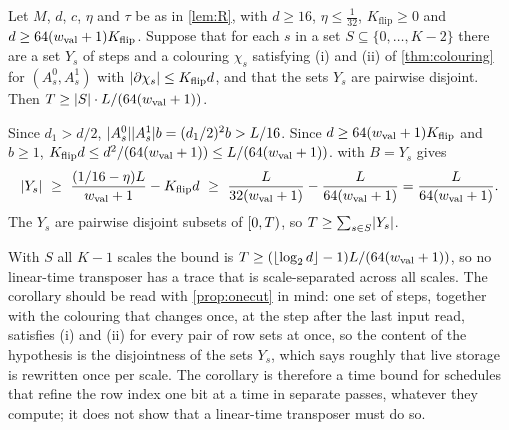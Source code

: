 \begin{corollary}\label{cor:scale-separated}
\notformalized
Let $M$, $d$, $c$, $\eta$ and $\tau$ be as in \cref{lem:R}, with $d\ge16$, $\eta\le\frac1{32}$, $K_{\mathrm{flip}}\ge0$ and
$d\ge64(w_{\mathrm{val}}+1)K_{\mathrm{flip}}$. Suppose that for each $s$ in a set $S\subseteq\{0,\dots,K-2\}$ there are a set $Y_s$ of steps and a
colouring $\chi_s$ satisfying (i) and (ii) of \cref{thm:colouring} for $(A_s^0,A_s^1)$ with $\lvert \partial\chi_s \rvert\le K_{\mathrm{flip}}d$, and
that the sets $Y_s$ are pairwise disjoint. Then $T\ge\lvert S \rvert\cdot L/(64(w_{\mathrm{val}}+1))$.
\end{corollary}

\begin{informalproof}
Since $d_1>d/2$, $\lvert A_s^0 \rvert\lvert A_s^1 \rvert b=(d_1/2)^2b>L/16$. Since $d\ge64(w_{\mathrm{val}}+1)K_{\mathrm{flip}}$ and $b\ge1$,
$K_{\mathrm{flip}}d\le d^2/(64(w_{\mathrm{val}}+1))\le L/(64(w_{\mathrm{val}}+1))$.  with $B=Y_s$ gives
\[
  \abs{Y_s}\ \ge\ \frac{(1/16-\eta)L}{\wval+1}-K_{\mathrm{flip}}d\ \ge\ \frac{L}{32(\wval+1)}-\frac{L}{64(\wval+1)}=\frac{L}{64(\wval+1)} .
\]
The $Y_s$ are pairwise disjoint subsets of $[0,T)$, so $T\ge\sum_{s\in S}\lvert Y_s \rvert$.
\end{informalproof}

With $S$ all $K-1$ scales the bound is $T\ge(\lfloor\log_2d\rfloor-1)L/(64(w_{\mathrm{val}}+1))$, so no linear-time transposer has a trace that is
scale-separated across all scales. The corollary should be read with \cref{prop:onecut} in mind: one set of steps, together with the
colouring that changes once, at the step after the last input read, satisfies (i) and (ii) for every pair of row sets at once, so the content
of the hypothesis is the disjointness of the sets $Y_s$, which says roughly that live storage is rewritten once per scale. The corollary is
therefore a time bound for schedules that refine the row index one bit at a time in separate passes, whatever they compute; it does not
show that a linear-time transposer must do so.
